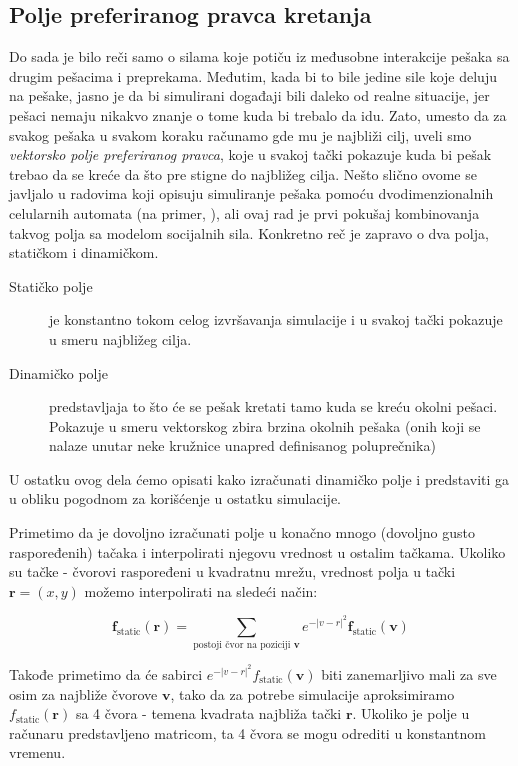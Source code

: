\documentclass[12pt]{article}
\begin{document}
    \subsection{Polje preferiranog pravca kretanja}
    Do sada je bilo reči samo o silama koje potiču iz međusobne interakcije pešaka sa drugim pešacima i preprekama. Međutim, kada bi to bile jedine sile koje deluju na pešake, jasno je da bi simulirani događaji bili daleko od realne situacije, jer pešaci nemaju nikakvo znanje o tome kuda bi trebalo da idu. Zato, umesto da za svakog pešaka u svakom koraku računamo gde mu je najbliži cilj, uveli smo \emph{vektorsko polje preferiranog pravca}, koje u svakoj tački pokazuje kuda bi pešak trebao da se kreće da što pre stigne do najbližeg cilja. Nešto slično ovome se javljalo u radovima koji opisuju simuliranje pešaka pomoću dvodimenzionalnih celularnih automata (na primer, \citep{Burstedde2001}), ali ovaj rad je prvi pokušaj kombinovanja takvog polja sa modelom socijalnih sila. Konkretno reč je zapravo o dva polja, statičkom i dinamičkom.
    \begin{description}
        \item[Statičko polje] je konstantno tokom celog izvršavanja simulacije i u svakoj tački pokazuje u smeru najbližeg cilja.
        \item[Dinamičko polje] predstavljaja to što će se pešak kretati tamo kuda se kreću okolni pešaci. Pokazuje u smeru vektorskog zbira brzina okolnih pešaka (onih koji se nalaze unutar neke kružnice unapred definisanog poluprečnika)
    \end{description}
    U ostatku ovog dela ćemo opisati kako izračunati dinamičko polje i predstaviti ga u obliku pogodnom za korišćenje u ostatku simulacije. 
    
    Primetimo da je dovoljno izračunati polje u konačno mnogo (dovoljno gusto raspoređenih) tačaka i interpolirati njegovu vrednost u ostalim tačkama. Ukoliko su tačke - čvorovi raspoređeni u kvadratnu mrežu, vrednost polja u tački $\mathbf r = (x,y)$ možemo interpolirati na sledeći način:
    
    $$
    	\mathbf f_\text{static} (\mathbf r) = \sum_{\text{postoji čvor na poziciji } \mathbf v} e^{-|v-r|^2} \mathbf f_\text{static} (\mathbf v)
    $$
	
	Takođe primetimo da će sabirci $e^{-|v-r|^2} f_\text{static} (\mathbf v)$ biti zanemarljivo mali za sve osim za najbliže čvorove $\mathbf v$, tako da za potrebe simulacije aproksimiramo $f_\text{static} (\mathbf r)$ sa 4 čvora - temena kvadrata najbliža tački $\mathbf r$. Ukoliko je polje u računaru predstavljeno matricom, ta 4 čvora se mogu odrediti u konstantnom vremenu.
	
\end{document}
